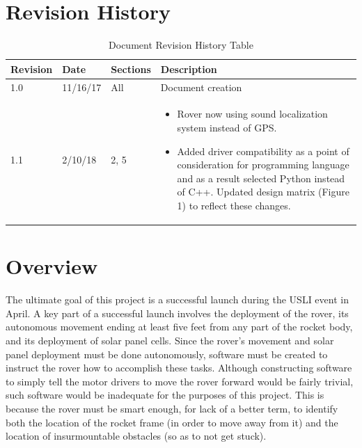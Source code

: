 \documentclass[onecolumn, draftclsnofoot,10pt, compsoc]{IEEEtran}
\begin{document}
\section{Revision History}
\begin{table}[h]
\centering
\caption{Document Revision History Table}
\label{table:Revision History}
\begin{tabular}{@{}lllp{12cm}@{}}
\toprule
\textbf{Revision}    & \textbf{Date}            & \textbf{Sections}  & \textbf{Description}                                                                                                                                             \\ \midrule
1.0                  & 11/16/17                  & All               & Document creation                                                                                                                                                \\ \midrule
1.1 & 2/10/18 & 2, 5 & \vspace{-15pt} \begin{itemize} \item Rover now using sound localization system instead of GPS. \item Added driver compatibility as a point of consideration for programming language and as a result selected Python instead of C++. Updated design matrix (Figure 1) to reflect these changes. \end{itemize} \vspace{-15pt} \\ \bottomrule
\end{tabular}
\end{table}
\section{Overview}
The ultimate goal of this project is a successful launch during the USLI event in April. A key part of a successful launch involves the deployment of the rover, its autonomous movement ending at least five feet from any part of the rocket body, and its deployment of solar panel cells. Since the rover's movement and solar panel deployment must be done autonomously, software must be created to instruct the rover how to accomplish these tasks. Although constructing software to simply tell the motor drivers to move the rover forward would be fairly trivial, such software would be inadequate for the purposes of this project. This is because the rover must be smart enough, for lack of a better term, to identify both the location of the rocket frame (in order to move away from it) and the location of insurmountable obstacles (so as to not get stuck). 
\end{document}
